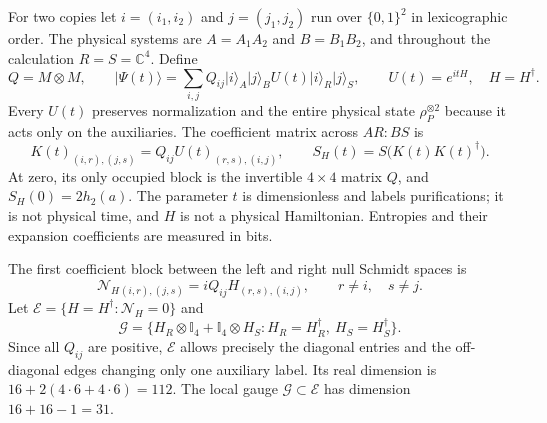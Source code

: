 \documentclass[11pt]{article}
\newcommand{\id}{\mathbb I}
\newcommand{\C}{\mathbb C}
\newcommand{\cE}{\mathcal E}
\newcommand{\cG}{\mathcal G}
\newcommand{\ket}[1]{\lvert#1\rangle}
\begin{document}
For two copies let $i=(i_1,i_2)$ and $j=(j_1,j_2)$ run over $\{0,1\}^2$ in lexicographic order. The physical systems are $A=A_1A_2$ and $B=B_1B_2$, and throughout the calculation $R=S=\C^4$. Define
\begin{equation}\label{eq:psi}
 Q=M\otimes M,\qquad
 \ket{\Psi(t)}=\sum_{i,j}Q_{ij}\ket{i}_A\ket{j}_B
                   U(t)\ket{i}_R\ket{j}_S,\qquad
 U(t)=e^{itH},\quad H=H^\dagger.
\end{equation}
Every $U(t)$ preserves normalization and the entire physical state $\rho_P^{\otimes2}$ because it acts only on the auxiliaries. The coefficient matrix across $AR:BS$ is
\begin{equation}\label{eq:schmidt}
 K(t)_{(i,r),(j,s)}=Q_{ij}U(t)_{(r,s),(i,j)},\qquad
 S_H(t)=S\bigl(K(t)K(t)^\dagger\bigr).
\end{equation}
At zero, its only occupied block is the invertible $4\times4$ matrix $Q$, and $S_H(0)=2h_2(a)$. The parameter $t$ is dimensionless and labels purifications; it is not physical time, and $H$ is not a physical Hamiltonian. Entropies and their expansion coefficients are measured in bits.

The first coefficient block between the left and right null Schmidt spaces is
\begin{equation}\label{eq:null}
 \mathcal N_H{}_{(i,r),(j,s)}
   =iQ_{ij}H_{(r,s),(i,j)},\qquad r\ne i,\quad s\ne j.
\end{equation}
Let $\cE=\{H=H^\dagger:\mathcal N_H=0\}$ and
\begin{equation}\label{eq:gauge}
 \cG=\{H_R\otimes\id_4+\id_4\otimes H_S:
                   H_R=H_R^\dagger,\ H_S=H_S^\dagger\}.
\end{equation}
Since all $Q_{ij}$ are positive, $\cE$ allows precisely the diagonal entries and the off-diagonal edges changing only one auxiliary label. Its real dimension is $16+2(4\cdot6+4\cdot6)=112$. The local gauge $\cG\subset\cE$ has dimension $16+16-1=31$.
\end{document}
